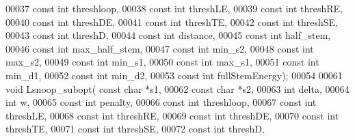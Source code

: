 \begin{DoxyCode}
00037                       \textcolor{keyword}{const} \textcolor{keywordtype}{int} threshloop, 
00038                       \textcolor{keyword}{const} \textcolor{keywordtype}{int} threshLE,
00039                       \textcolor{keyword}{const} \textcolor{keywordtype}{int} threshRE,
00040                       \textcolor{keyword}{const} \textcolor{keywordtype}{int} threshDE,
00041                       \textcolor{keyword}{const} \textcolor{keywordtype}{int} threshTE,
00042                       \textcolor{keyword}{const} \textcolor{keywordtype}{int} threshSE,
00043                       \textcolor{keyword}{const} \textcolor{keywordtype}{int} threshD,
00044                       \textcolor{keyword}{const} \textcolor{keywordtype}{int} distance,
00045                       \textcolor{keyword}{const} \textcolor{keywordtype}{int} half\_stem,
00046                       \textcolor{keyword}{const} \textcolor{keywordtype}{int} max\_half\_stem,
00047                       \textcolor{keyword}{const} \textcolor{keywordtype}{int} min\_s2,
00048                       \textcolor{keyword}{const} \textcolor{keywordtype}{int} max\_s2,
00049                       \textcolor{keyword}{const} \textcolor{keywordtype}{int} min\_s1,
00050                       \textcolor{keyword}{const} \textcolor{keywordtype}{int} max\_s1,
00051                       \textcolor{keyword}{const} \textcolor{keywordtype}{int} min\_d1,
00052                       \textcolor{keyword}{const} \textcolor{keywordtype}{int} min\_d2,
00053           \textcolor{keyword}{const} \textcolor{keywordtype}{int} fullStemEnergy);
00054 
00061 \textcolor{keywordtype}{void} Lsnoop\_subopt( \textcolor{keyword}{const} \textcolor{keywordtype}{char} *s1,
00062                     \textcolor{keyword}{const} \textcolor{keywordtype}{char} *s2,
00063                     \textcolor{keywordtype}{int} delta,
00064                     \textcolor{keywordtype}{int} w, 
00065                     \textcolor{keyword}{const} \textcolor{keywordtype}{int} penalty,
00066                     \textcolor{keyword}{const} \textcolor{keywordtype}{int} threshloop, 
00067                     \textcolor{keyword}{const} \textcolor{keywordtype}{int} threshLE,
00068                     \textcolor{keyword}{const} \textcolor{keywordtype}{int} threshRE,
00069                     \textcolor{keyword}{const} \textcolor{keywordtype}{int} threshDE,
00070                     \textcolor{keyword}{const} \textcolor{keywordtype}{int} threshTE,
00071                     \textcolor{keyword}{const} \textcolor{keywordtype}{int} threshSE,
00072                     \textcolor{keyword}{const} \textcolor{keywordtype}{int} threshD,

\end{DoxyCode}
